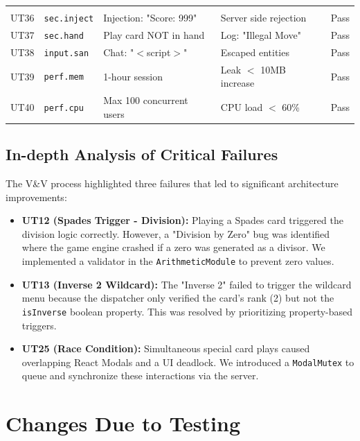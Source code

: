 \documentclass[12pt, titlepage]{article}
\begin{document}
\begin{small}
\begin{xltabular}{\textwidth}{l p{2.2cm} X X l}
            \midrule
              \\
            UT36 & \texttt{sec.inject} & Injection: "Score: 999" & Server side rejection & Pass \\
            UT37 & \texttt{sec.hand} & Play card NOT in hand & Log: "Illegal Move" & Pass \\
            UT38 & \texttt{input.san} & Chat: "$<$script$>$" & Escaped entities & Pass \\
            UT39 & \texttt{perf.mem} & 1-hour session & Leak $<$ 10MB increase & Pass \\
            UT40 & \texttt{perf.cpu} & Max 100 concurrent users & CPU load $<$ 60\% & Pass \\
        \end{xltabular}
    \end{small}

    \subsection{In-depth Analysis of Critical Failures}
    The V\&V process highlighted three failures that led to significant architecture improvements:
    \begin{itemize}
        \item \textbf{UT12 (Spades Trigger - Division):} Playing a Spades card triggered the division logic correctly. However, a "Division by Zero" bug was identified where the game engine crashed if a zero was generated as a divisor. We implemented a validator in the \texttt{ArithmeticModule} to prevent zero values.

        \item \textbf{UT13 (Inverse 2 Wildcard):} The "Inverse 2" failed to trigger the wildcard menu because the dispatcher only verified the card's rank (2) but not the \texttt{isInverse} boolean property. This was resolved by prioritizing property-based triggers.

        \item \textbf{UT25 (Race Condition):} Simultaneous special card plays caused overlapping React Modals and a UI deadlock. We introduced a \texttt{ModalMutex} to queue and synchronize these interactions via the server.
    \end{itemize}



    \section{Changes Due to Testing}
\end{document}
